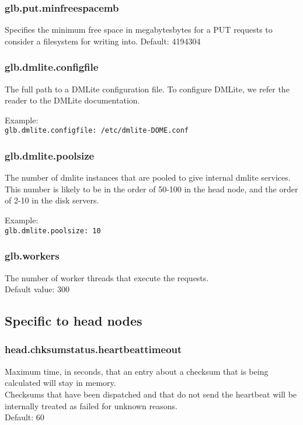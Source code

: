 \documentclass[a4paper,10pt]{scrreprt}
\begin{document}
\subsubsection{glb.put.minfreespacemb}
Specifies the minimum free space in megabytesbytes for a PUT requests to consider a filesystem for writing into.
Default: 4194304

\subsubsection{glb.dmlite.configfile}
 

The full path to a DMLite configuration file. To configure DMLite, we refer the reader to the DMLite documentation.

 Example:\\
\lstinline"glb.dmlite.configfile: /etc/dmlite-DOME.conf"\\


\subsubsection{glb.dmlite.poolsize}

The number of dmlite instances that are pooled to give internal dmlite services. This number is likely to be in the order of 50-100 in the head node, and the order of 2-10 in the disk servers.

 Example:\\
\lstinline"glb.dmlite.poolsize: 10"\\

\subsubsection{glb.workers}

The number of worker threads that execute the requests.\\
Default value: 300\\

\subsection{Specific to head nodes}

\subsubsection{head.chksumstatus.heartbeattimeout}
Maximum time, in seconds, that an entry about a checksum that is being calculated will stay in memory.\\
Checksums that have been dispatched and that do not send the heartbeat will be internally treated as failed for unknown reasons.\\
Default: 60\\
\end{document}

